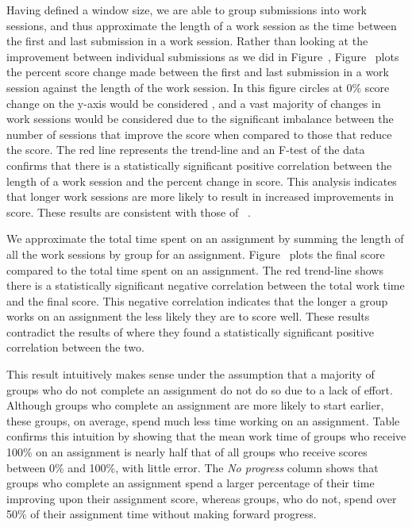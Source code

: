 Having defined a window size, we are able to group submissions into work
sessions, and thus approximate the length of a work session as the time between
the first and last submission in a work session. Rather than looking at the
improvement between individual submissions as we did in
Figure~, Figure~
plots the percent score change made between the first and last submission in a
work session against the length of the work session. In this figure circles at
0\% score change on the y-axis would be considered \noi{}, and a vast majority
of changes in work sessions would be considered \imp{} due to the significant
imbalance between the number of sessions that improve the score when compared
to those that reduce the score. The red line represents the trend-line and an
F-test of the data confirms that there is a statistically significant positive
correlation between the length of a work session and the percent change in
score. This analysis indicates that longer work sessions are more likely to
result in increased improvements in score. These results are consistent with
those of \spacco{}~\cite{Spacco:2013:TIP:2462476.2465594}.

We approximate the total time spent on an assignment by summing the length of
all the work sessions by group for an
assignment. Figure~ plots the final score compared to
the total time spent on an assignment. The red trend-line shows there is a
statistically significant negative correlation between the total work time and
the final score. This negative correlation indicates that the longer a group
works on an assignment the less likely they are to score well. These results
contradict the results of \spacco{} where they found a statistically
significant positive correlation between the two.

This result intuitively makes sense under the assumption that a majority of
groups who do not complete an assignment do not do so due to a lack of
effort. Although groups who complete an assignment are more likely to start
earlier, these groups, on average, spend much less time working on an
assignment. Table~ confirms this intuition by showing
that the mean work time of groups who receive 100\% on an assignment is nearly
half that of all groups who receive scores between 0\% and 100\%, with little
error. The \emph{No progress} column shows that groups who complete an
assignment spend a larger percentage of their time improving upon their
assignment score, whereas groups, who do not, spend over 50\% of their
assignment time without making forward progress.

